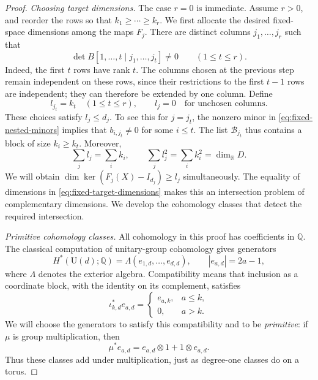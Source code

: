 \begin{proof}
\emph{Choosing target dimensions.}
The case $r=0$ is immediate.  Assume $r>0$, and reorder the rows so that
$k_1\geq\cdots\geq k_r$.  We first allocate the desired fixed-space
dimensions among the maps $F_j$.  There are distinct columns
$j_1,\ldots,j_r$ such that
\begin{equation}\label{eq:fixed-nested-minors}
 \det B[1,\ldots,t\mid j_1,\ldots,j_t]\ne 0
 \qquad (1\leq t\leq r).
\end{equation}
Indeed, the first $t$ rows have rank $t$.  The columns chosen at the previous
step remain independent on these rows, since their restrictions to the
first $t-1$ rows are independent; they can therefore be extended by one
column.  Define
\[
 l_{j_t}=k_t\quad(1\leq t\leq r),
 \qquad l_j=0\quad\text{for unchosen columns}.
\]
These choices satisfy $l_j\leq d_j$.  To see this for $j=j_t$, the
nonzero minor in \eqref{eq:fixed-nested-minors} implies that $b_{i,j_t}\ne0$
for some $i\leq t$.  The list $\mathcal B_{j_t}$ thus contains a block
of size $k_i\geq k_t$.  Moreover,
\begin{equation}\label{eq:fixed-target-dimensions}
 \sum_j l_j=\sum_i k_i,
 \qquad \sum_j l_j^2=\sum_i k_i^2=\dim_{\mathbb R}D.
\end{equation}
We will obtain $\dim\ker(F_j(X)-I_{d_j})\geq l_j$ simultaneously.
The equality of dimensions in \eqref{eq:fixed-target-dimensions} makes
this an intersection problem of complementary dimensions.  We develop
the cohomology classes that detect the required intersection.

\smallskip\noindent
\emph{Primitive cohomology classes.}
All cohomology in this proof has coefficients in $\mathbb Q$.  The
classical computation of unitary-group cohomology
\cite[Proposition~9.1 and Sections~19--20]{Borel1953} gives generators
\begin{equation}\label{eq:fixed-unitary-cohomology}
 H^*(\mathrm U(d);\mathbb Q)
   =\Lambda(e_{1,d},\ldots,e_{d,d}),
 \qquad |e_{a,d}|=2a-1,
\end{equation}
where $\Lambda$ denotes the exterior algebra.  Compatibility means that
inclusion as a coordinate block, with the identity on its complement,
satisfies
\begin{equation}\label{eq:fixed-block-restriction}
 \iota_{k,d}^*e_{a,d}=
 \begin{cases}
 e_{a,k},&a\leq k,\\
 0,&a>k.
 \end{cases}
\end{equation}
We will choose the generators to satisfy this compatibility and to be
\emph{primitive}: if $\mu$ is group multiplication, then
\begin{equation}\label{eq:fixed-primitivity}
 \mu^*e_{a,d}=e_{a,d}\otimes1+1\otimes e_{a,d}.
\end{equation}
Thus these classes add under multiplication, just as degree-one
classes do on a torus.


\end{proof}
